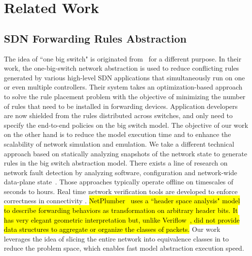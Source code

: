 \section{Related Work}
\label{Sec:relatedwork}

\subsection{SDN Forwarding Rules Abstraction}

The idea of ``one big switch" is originated from~\mbox{\cite{OneBigSwitchAbstraction}} for a different purpose. In their work, the one-big-switch network abstraction is used to reduce conflicting rules generated by various high-level SDN applications that simultaneously run on one or even multiple controllers.
Their system takes an optimization-based approach to solve the rule placement problem with the objective of minimizing the number of rules that need to be installed in forwarding devices. Application developers are now shielded from the rules distributed across switches, and only need to specify the end-to-end policies on the big switch model. 
The objective of our work on the other hand is to reduce the model execution time and to enhance the scalability of network simulation and emulation. We take a different technical approach based on statically analyzing snapshots of the network state to generate rules in the big switch abstraction model.
There exists a line of research on network fault detection by analyzing software,
configuration and network-wide data-plane state~\cite{Al-Shaer2010,Al-Shaer2009,Anteater2011,xz+05}.
Those approaches typically operate offline on timescales of seconds to hours.
Real time network verification tools are developed to enforce correctness in connectivity \cite{NetPlumber2013,Veriflow}.
\hl{
NetPlumber~\mbox{\cite{NetPlumber2013}} uses a ``header space analysis" model to
describe forwarding behaviors as transformation on arbitrary header bits.
It has very elegant geometric interpretation but, unlike Veriflow~\mbox{\cite{Veriflow}}, did not
provide data structures to aggregate or organize the classes of packets.
}
\fi
Our work leverages the idea of slicing the entire network into equivalence classes in \cite{Veriflow} to reduce the problem space, which enables fast model abstraction execution speed.


